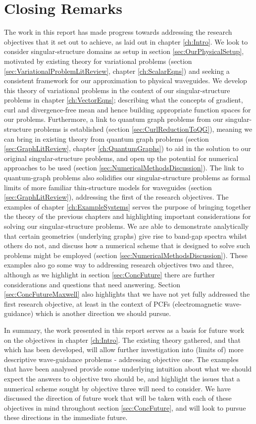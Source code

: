 \section{Closing Remarks} \label{sec:ConcClosingRemarks}
The work in this report has made progress towards addressing the research objectives that it set out to achieve, as laid out in chapter \ref{ch:Intro}.
We look to consider singular-structure domains as setup in section \ref{sec:OurPhysicalSetup}, motivated by existing theory for variational problems (section \ref{sec:VariationalProblemLitReview}, chapter \ref{ch:ScalarEqns}) and seeking a consistent framework for our approximation to physical waveguides.
We develop this theory of variational problems in the context of our singular-structure problems in chapter \ref{ch:VectorEqns}; describing what the concepts of gradient, curl and divergence-free mean and hence building appropriate function spaces for our problems.
Furthermore, a link to quantum graph problems from our singular-structure problems is established (section \ref{sec:CurlReductionToQG}), meaning we can bring in existing theory from quantum graph problems (section \ref{sec:GraphLitReview}, chapter \ref{ch:QuantumGraphs}) to aid in the solution to our original singular-structure problems, and open up the potential for numerical approaches to be used (section \ref{sec:NumericalMethodsDiscussion}).
The link to quantum-graph problems also solidifies our singular-structure problems as formal limits of more familiar thin-structure models for waveguides (section \ref{sec:GraphLitReview}), addressing the first of the research objectives.
The examples of chapter \ref{ch:ExampleSystems} serves the purpose of bringing together the theory of the previous chapters and highlighting important considerations for solving our singular-structure problems.
We are able to demonstrate analytically that certain geometries (underlying graphs) give rise to band-gap spectra whilst others do not, and discuss how a numerical scheme that is designed to solve such problems might be employed (section \ref{sec:NumericalMethodsDiscussion}).
These examples also go some way to addressing research objectives two and three, although as we highlight in section \ref{sec:ConcFuture} there are further considerations and questions that need answering.
Section \ref{sec:ConcFutureMaxwell} also highlights that we have not yet fully addressed the first research objective, at least in the context of PCFs (electromagnetic wave-guidance) which is another direction we should pursue. \newline

In summary, the work presented in this report serves as a basis for future work on the objectives in chapter \ref{ch:Intro}.
The existing theory gathered, and that which has been developed, will allow further investigation into (limits of) more descriptive wave-guidance problems - addressing objective one.
The examples that have been analysed provide some underlying intuition about what we should expect the answers to objective two should be, and highlight the issues that a numerical scheme sought by objective three will need to consider.
We have discussed the direction of future work that will be taken with each of these objectives in mind throughout section \ref{sec:ConcFuture}, and will look to pursue these directions in the immediate future.